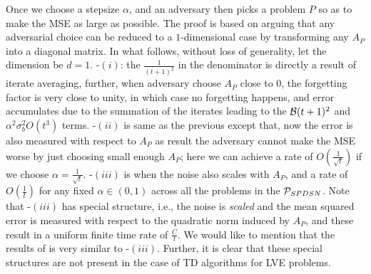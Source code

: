 Once we choose a stepsize $\alpha$, and an adversary then picks a problem $P$ so as to make the MSE as large as possible. The proof is based on arguing that any adversarial choice can be reduced to a $1$-dimensional case by transforming any $A_P$ into a diagonal matrix. In what follows, without loss of generality, let the dimension be $d=1$.
-$(i)$: the $\frac{1}{(t+1)^2}$ in the denominator is directly a result of iterate averaging,  further, when adversary choose $A_P$ close to $0$, the forgetting factor is very close to unity, in which case no forgetting happens, and error accumulates due to the summation of the iterates leading to the $\B(t+1)^2$ and $\alpha^2 \sigma_b^2 O(t^3)$ terms. -$(ii)$ is same as the previous except that, now the error is also measured with respect to $A_P$ as result the adversary cannot make the MSE worse by just choosing small enough $A_P$; here we can achieve a rate of $O(\frac{1}{\sqrt{t}})$ if we choose $\alpha=\frac{1}{\sqrt{t}}$. -$(iii)$ is when the noise also scales with $A_P$, and a rate of $O(\frac{1}{t})$ for any fixed $\alpha\in(0,1)$ across all the problems in the $\P_{SPDSN}$. Note that -$(iii)$ has special structure, i.e., the noise is \emph{scaled} and the mean squared error is measured with respect to the quadratic norm induced by $A_P$, and these result in a uniform finite time rate of $\frac{C}{t}$. We would like to mention that the results of \citet{bach} is very similar to  -$(iii)$. Further, it is clear that these special structures are not present in the case of TD algorithms for LVE problems.

